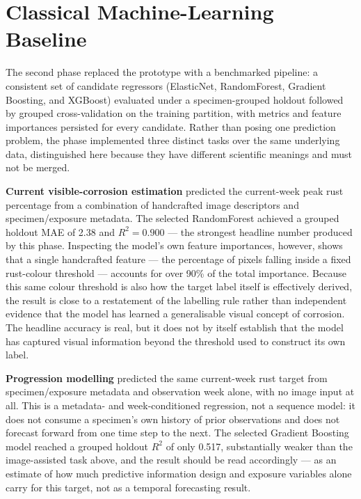 \section{Classical Machine-Learning Baseline}
\label{sec:phase1}

The second phase replaced the prototype with a benchmarked pipeline: a
consistent set of candidate regressors (ElasticNet, RandomForest, Gradient
Boosting, and XGBoost) evaluated under a specimen-grouped holdout followed by
grouped cross-validation on the training partition, with metrics and feature
importances persisted for every candidate. Rather than posing one prediction
problem, the phase implemented three distinct tasks over the same
underlying data, distinguished here because they have different scientific
meanings and must not be merged.

\textbf{Current visible-corrosion estimation} predicted the current-week peak
rust percentage from a combination of handcrafted image descriptors and
specimen/exposure metadata. The selected RandomForest achieved a grouped
holdout MAE of 2.38 and $R^2 = 0.900$ — the strongest headline number produced
by this phase. Inspecting the model's own feature importances, however,
shows that a single handcrafted feature — the percentage of pixels falling
inside a fixed rust-colour threshold — accounts for over 90\% of the total
importance. Because this same colour threshold is also how the target label
itself is effectively derived, the result is close to a restatement of the
labelling rule rather than independent evidence that the model has learned a
generalisable visual concept of corrosion. The headline accuracy is real, but
it does not by itself establish that the model has captured visual
information beyond the threshold used to construct its own label.

\textbf{Progression modelling} predicted the same current-week rust target
from specimen/exposure metadata and observation week alone, with no image
input at all. This is a metadata- and week-conditioned regression, not a
sequence model: it does not consume a specimen's own history of prior
observations and does not forecast forward from one time step to the next.
The selected Gradient Boosting model reached a grouped holdout $R^2$ of only
0.517, substantially weaker than the image-assisted task above, and the
result should be read accordingly — as an estimate of how much predictive
information design and exposure variables alone carry for this target,
not as a temporal forecasting result.

